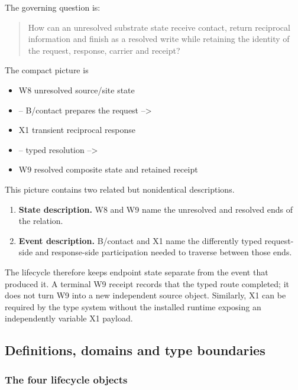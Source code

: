 The governing question is:

\begin{quote}
How can an unresolved substrate state receive contact, return reciprocal
information and finish as a resolved write while retaining the identity
of the request, response, carrier and receipt?
\end{quote}

The compact picture is

\begin{itemize}
\tightlist
\item
  W8 unresolved source/site state
\item
  -- B/contact prepares the request --\textgreater{}
\item
  X1 transient reciprocal response
\item
  -- typed resolution --\textgreater{}
\item
  W9 resolved composite state and retained receipt
\end{itemize}

This picture contains two related but nonidentical descriptions.

\begin{enumerate}
\def\labelenumi{\arabic{enumi}.}
\tightlist
\item
  \textbf{State description.} W8 and W9 name the unresolved and resolved
  ends of the relation.
\item
  \textbf{Event description.} B/contact and X1 name the differently
  typed request-side and response-side participation needed to traverse
  between those ends.
\end{enumerate}

The lifecycle therefore keeps endpoint state separate from the event
that produced it. A terminal W9 receipt records that the typed route
completed; it does not turn W9 into a new independent source object.
Similarly, X1 can be required by the type system without the installed
runtime exposing an independently variable X1 payload.

\subsection{Definitions, domains and type
boundaries}\label{viii-ch05-definitions-domains-and-type-boundaries}

\subsubsection{The four lifecycle
objects}\label{viii-ch05-the-four-lifecycle-objects}

